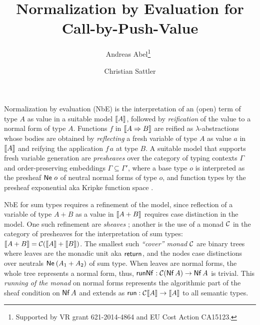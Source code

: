 \documentclass[a4paper]{easychair}
\begin{document}
\title{Normalization by Evaluation for Call-by-Push-Value}
\author{Andreas Abel\thanks{Supported by VR grant 621-2014-4864 and EU
  Cost Action CA15123.}~
  \and Christian Sattler}


\maketitle


\noindent

Normalization by evaluation (NbE) \citep{bergerSchwichtenberg:lics91}
is the interpretation of
an (open) term of type $A$ as value in a suitable model $\mathopen{{[\kern-0.14em[}} A \mathclose{{]\kern-0.14em]}}$,
followed by \emph{reification} of the value to a normal form of type
$A$.  Functions $f$ in $\mathopen{{[\kern-0.14em[}} A \Rightarrow B \mathclose{{]\kern-0.14em]}}$ are reified as
$\lambda$-abstractions whose bodies are obtained
by \emph{reflecting} a fresh variable of type $A$ as value $a$ in
$\mathopen{{[\kern-0.14em[}} A \mathclose{{]\kern-0.14em]}}$ and reifying the application $f\,a$ at type $B$.
A suitable model that supports fresh variable generation
are \emph{presheaves} over the category of
typing contexts $\Gamma$ and order-preserving embeddings
$\Gamma \subseteq \Gamma'$, where a base type $o$ is interpreted as
the presheaf $\mathsf{Ne}^{}\;o$ of neutral normal forms of type $o$, and
function types by the presheaf exponential aka Kripke function space
\citep{catarina:csl93,altenkirchHofmannStreicher:ctcs95}.

NbE for sum types requires a refinement of the model, since reflection of
a variable of type $A + B$ as a value in $\mathopen{{[\kern-0.14em[}} A + B \mathclose{{]\kern-0.14em]}}$ requires case
distinction in the model.  One such refinement are \emph{sheaves}
\citep{altenkirchDybjerHofmannScott:lics01}; another is the use of a
monad $\mathcal{C}$
\citep{%
filinski:tlca01,barral:PhD}
in the category of presheaves
for the interpretation of sum types:
$\mathopen{{[\kern-0.14em[}} A + B \mathclose{{]\kern-0.14em]}} = \mathcal{C}(\mathopen{{[\kern-0.14em[}} A \mathclose{{]\kern-0.14em]}} + \mathopen{{[\kern-0.14em[}} B \mathclose{{]\kern-0.14em]}})$.
The smallest such \emph{``cover'' monad} $\mathcal{C}$ are binary trees where leaves are
the monadic unit aka $\mathsf{return}^{}$, and the nodes case distinctions
over neutrals $\mathsf{Ne}^{}\,(A_1 + A_2)$ of sum type.  When leaves are normal
forms, the whole tree represents a normal form, thus,
$\mathsf{runNf}^{} : \mathcal{C}(\mathsf{Nf}\,A) \to \mathsf{Nf}\,A$ is trivial.
This \emph{running of the monad}
on normal forms represents the algorithmic part of the sheaf condition
on $\mathsf{Nf}\,A$ and extends as $\mathsf{run} : \mathcal{C} \mathopen{{[\kern-0.14em[}} A \mathclose{{]\kern-0.14em]}} \to \mathopen{{[\kern-0.14em[}} A \mathclose{{]\kern-0.14em]}}$ to all
semantic types.
\end{document}
